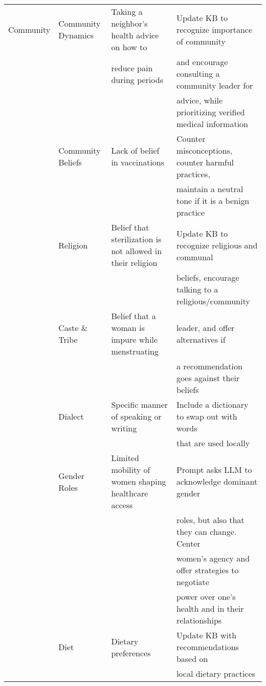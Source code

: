 \begin{table*}[h]
\begin{tabular}{l l l l}
Community & Community Dynamics & Taking a neighbor's health advice on how to & Update KB to recognize importance of community \\
 & & reduce pain during periods &  and encourage consulting a community leader for  \\
  & & & advice, while prioritizing verified medical information \\
   & Community Beliefs & Lack of belief in vaccinations & Counter misconceptions, counter harmful practices,  \\  
  & & & maintain a neutral tone if it is a benign practice \\
 & Religion & Belief that sterilization is not allowed in their religion & Update KB to recognize religious and communal  \\
   &  &  &   beliefs, encourage talking to a religious/community  \\
 & Caste \& Tribe & Belief that a woman is impure while menstruating &  leader, and offer alternatives if \\
 & & & a recommendation goes against their beliefs \\
 & Dialect & Specific manner of speaking or writing & Include a dictionary to swap out with words  \\
  &  &  & that are used locally \\
& Gender Roles & Limited mobility of women shaping healthcare access & Prompt asks LLM to acknowledge dominant gender \\
& & &   roles, but also that they can change. Center  \\
& & & women's agency and offer strategies to negotiate  \\
& & &  power over one's health and in their relationships \\
 & Diet & Dietary preferences & Update KB with recommendations based on \\
 & & &  local dietary practices \\
   \hline
   

\end{tabular}
\end{table*}
